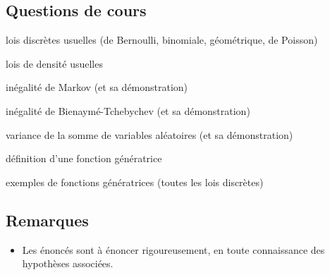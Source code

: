 \subsection*{Questions de cours}
\begin{enumeratebf}
    \item lois discrètes usuelles (de Bernoulli, binomiale, géométrique, de Poisson)
    \item lois de densité usuelles
    \item inégalité de Markov (et sa démonstration)
    \item inégalité de Bienaymé-Tchebychev (et sa démonstration)
    \item variance de la somme de variables aléatoires (et sa démonstration)
    \item définition d'une fonction génératrice
    \item exemples de fonctions génératrices (toutes les lois discrètes)
\end{enumeratebf}

\subsection*{Remarques}

\begin{itemize}
    \item Les énoncés sont à énoncer rigoureusement, en toute connaissance des hypothèses associées.
\end{itemize}

